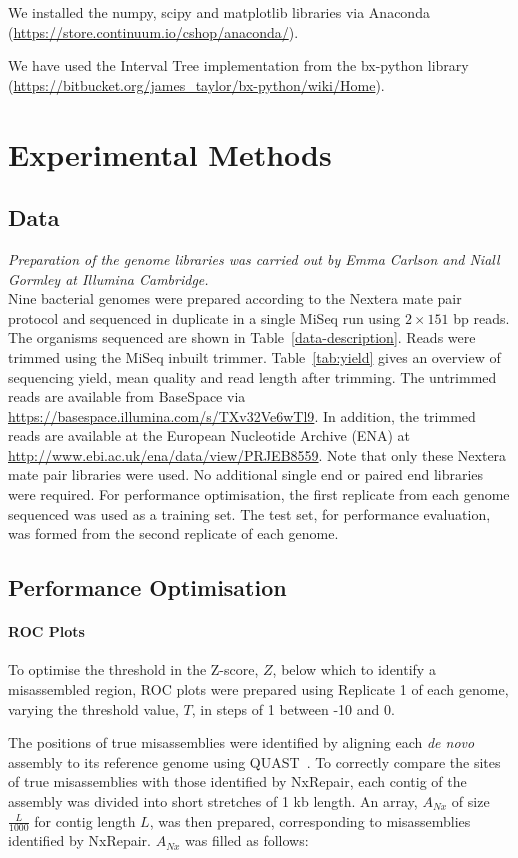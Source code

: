 We installed the numpy, scipy and matplotlib libraries via Anaconda (\url{https://store.continuum.io/cshop/anaconda/}).

We have used the Interval Tree implementation from the bx-python library (\url{https://bitbucket.org/james_taylor/bx-python/wiki/Home}).   

\section{Experimental Methods}
\subsection{Data}
\textit{Preparation of the genome libraries was carried out by Emma Carlson and Niall Gormley at Illumina Cambridge.} \\
Nine bacterial genomes were prepared according to the Nextera mate pair protocol and sequenced in duplicate in a single MiSeq run using $2 \times 151$ bp reads. The organisms sequenced are shown in Table~\ref{data-description}. Reads were trimmed using the MiSeq inbuilt trimmer. Table~\ref{tab:yield} gives an overview of sequencing yield, mean quality and read length after trimming. The untrimmed reads are available from BaseSpace via \url{https://basespace.illumina.com/s/TXv32Ve6wTl9}. In addition,
the trimmed reads are available at the European Nucleotide Archive (ENA) at \url{http://www.ebi.ac.uk/ena/data/view/PRJEB8559}. Note that only these Nextera mate pair libraries were used. No additional single end or paired end libraries were required. For performance optimisation, the first replicate from each genome sequenced was used as a training set. The test set, for performance evaluation, was formed from the second replicate of each genome. 

\subsection{Performance Optimisation}
\label{sect:optimisation}
\paragraph*{ROC Plots}
To optimise the threshold in the Z-score, $Z$, below which to identify a misassembled region, ROC plots were prepared using Replicate 1 of each genome, varying the threshold value, $T$, in steps of 1 between -10 and 0. 

The positions of true misassemblies were identified by aligning each \textit{de novo} assembly to its reference genome using QUAST~\cite{Gurevich2013}. To correctly compare the sites of true misassemblies with those identified by NxRepair, each contig of the assembly was divided into short stretches of 1 kb length. An array, $A_{Nx}$ of size $\frac{L}{1000}$ for contig length $L$, was then prepared, corresponding to misassemblies identified by NxRepair. $A_{Nx}$ was filled as follows:

